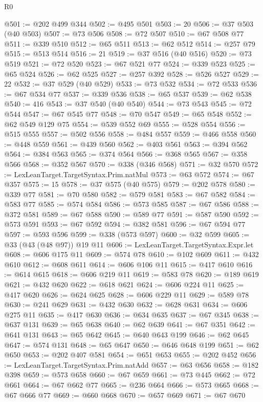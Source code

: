 \begin{lexlean}{R0}
\begin{coremodule}
@501 := @202 @499 @344
@502 := @495 @501
@503 := 20
@506 := @37 @503 (@40 @503)
@507 := @73 @506
@508 := @72 @507
@510 := @67 @508 @77
@511 := @339 @510
@512 := @65 @511
@513 := @62 @512
@514 := @257 @79
@515 := @513 @514
@516 := 21
@519 := @37 @516 (@40 @516)
@520 := @73 @519
@521 := @72 @520
@523 := @67 @521 @77
@524 := @339 @523
@525 := @65 @524
@526 := @62 @525
@527 := @257 @392
@528 := @526 @527
@529 := 22
@532 := @37 @529 (@40 @529)
@533 := @73 @532
@534 := @72 @533
@536 := @67 @534 @77
@537 := @339 @536
@538 := @65 @537
@539 := @62 @538
@540 := 416
@543 := @37 @540 (@40 @540)
@544 := @73 @543
@545 := @72 @544
@547 := @67 @545 @77
@548 := @70 @547
@549 := @65 @548
@552 := @62 @549 @129 @75
@554 := @539 @552 @69
@555 := @528 @554
@556 := @515 @555
@557 := @502 @556
@558 := @484 @557
@559 := @466 @558
@560 := @448 @559
@561 := @439 @560
@562 := @403 @561
@563 := @394 @562
@564 := @384 @563
@565 := @374 @564
@566 := @368 @565
@567 := @358 @566
@568 := @352 @567
@570 := @338 (@346 @568)
@571 := @32 @570
@572 := LexLeanTarget.TargetSyntax.Prim.natMul
@573 := @63 @572
@574 := @67 @357
@575 := 15
@578 := @37 @575 (@40 @575)
@579 := @202 @578
@580 := @339 @77
@581 := @70 @580
@582 := @579 @581
@583 := @67 @582
@584 := @583 @77
@585 := @574 @584
@586 := @573 @585
@587 := @67 @586
@588 := @372 @581
@589 := @67 @588
@590 := @589 @77
@591 := @587 @590
@592 := @573 @591
@593 := @67 @592
@594 := @382 @581
@596 := @67 @594 @77
@597 := @593 @596
@599 := @338 (@573 @597)
@600 := @32 @599
@605 := @33 (@43 (@48 @97)) @19 @11
@606 := LexLeanTarget.TargetSyntax.Expr.let
@608 := @606 @175 @11
@609 := @574 @78
@610 := @102 @609
@611 := @432 @610
@612 := @608 @611
@614 := @606 @106 @11
@615 := @417 @610
@616 := @614 @615
@618 := @606 @219 @11
@619 := @583 @78
@620 := @189 @619
@621 := @432 @620
@622 := @618 @621
@624 := @606 @224 @11
@625 := @417 @620
@626 := @624 @625
@628 := @606 @229 @11
@629 := @589 @78
@630 := @241 @629
@631 := @432 @630
@632 := @628 @631
@634 := @606 @275 @11
@635 := @417 @630
@636 := @634 @635
@637 := @67 @345
@638 := @637 @131
@639 := @65 @638
@640 := @62 @639
@641 := @67 @351
@642 := @641 @131
@643 := @65 @642
@645 := @640 @643 @199
@646 := @62 @645
@647 := @574 @131
@648 := @65 @647
@650 := @646 @648 @199
@651 := @62 @650
@653 := @202 @407 @581
@654 := @651 @653
@655 := @202 @452
@656 := LexLeanTarget.TargetSyntax.Prim.natAdd
@657 := @63 @656
@658 := @182 @398
@659 := @573 @658
@660 := @67 @659
@661 := @73 @445
@662 := @72 @661
@664 := @67 @662 @77
@665 := @236 @664
@666 := @573 @665
@668 := @67 @666 @77
@669 := @660 @668
@670 := @657 @669
@671 := @67 @670

\end{coremodule}
\end{lexlean}
